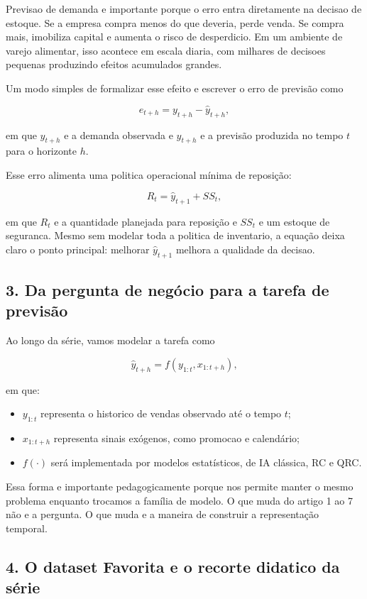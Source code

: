 \documentclass[12pt]{article}
\providecommand{\tightlist}{%
          \setlength{\itemsep}{0pt}\setlength{\parskip}{0pt}}
\begin{document}
Previsao de demanda e importante porque o erro entra diretamente na decisao de estoque. Se a empresa compra menos do que deveria, perde venda. Se compra mais, imobiliza capital e aumenta o risco de desperdicio. Em um ambiente de varejo alimentar, isso acontece em escala diaria, com milhares de decisoes pequenas produzindo efeitos acumulados grandes.

Um modo simples de formalizar esse efeito e escrever o erro de previsão como

\[
e_{t+h} = y_{t+h} - \hat{y}_{t+h},
\]

em que \(y_{t+h}\) e a demanda observada e \(\hat{y}_{t+h}\) e a previsão produzida no tempo \(t\) para o horizonte \(h\).

Esse erro alimenta uma politica operacional mínima de reposição:

\[
R_t = \hat{y}_{t+1} + SS_t,
\]

em que \(R_t\) e a quantidade planejada para reposição e \(SS_t\) e um estoque de seguranca. Mesmo sem modelar toda a politica de inventario, a equação deixa claro o ponto principal: melhorar \(\hat{y}_{t+1}\) melhora a qualidade da decisao.

\subsection{3. Da pergunta de negócio para a tarefa de previsão}\label{3-da-pergunta-de-neguxf3cio-para-a-tarefa-de-previsuxe3o}

Ao longo da série, vamos modelar a tarefa como

\[
\hat{y}_{t+h} = f(y_{1:t}, x_{1:t+h}),
\]

em que:

\begin{itemize}
\tightlist
\item
  \(y_{1:t}\) representa o historico de vendas observado até o tempo \(t\);
\item
  \(x_{1:t+h}\) representa sinais exógenos, como promocao e calendário;
\item
  \(f(\cdot)\) será implementada por modelos estatísticos, de IA clássica, RC e QRC.
\end{itemize}

Essa forma e importante pedagogicamente porque nos permite manter o mesmo problema enquanto trocamos a família de modelo. O que muda do artigo 1 ao 7 não e a pergunta. O que muda e a maneira de construir a representação temporal.

\subsection{4. O dataset Favorita e o recorte didatico da série}\label{4-o-dataset-favorita-e-o-recorte-didatico-da-suxe9rie}
\end{document}
